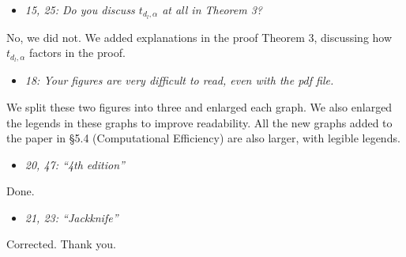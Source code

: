 \documentclass[11pt,notitlepage,onecolumn]{article}
\newcommand{\noi}{\noindent}
\begin{document}
\begin{itemize}
\item[] \textit{15, 25: Do you discuss $t_{d_l,\alpha}$ at all in Theorem 3?}
\end{itemize}

\noi
No, we did not.   
We added explanations in the proof Theorem 3, discussing how $t_{d_l,\alpha}$ factors in the proof. 
\medskip 



\begin{itemize}
\item[] \textit{18: Your figures are very difficult to read, even with the pdf file.}
\end{itemize}

\noi
We split these two figures into three and enlarged each graph. 
We also enlarged the legends in these graphs to improve readability.
All the new graphs added to the paper in \S 5.4 (Computational Efficiency) are also larger, with legible legends. 
\medskip 



\begin{itemize}
\item[] \textit{20, 47: ``4th edition''}
\end{itemize}

\noi
Done.
\medskip 



\begin{itemize}
\item[] \textit{21, 23: ``\it Jackknife''}
\end{itemize}

\noi
Corrected. Thank you. 
\end{document}
